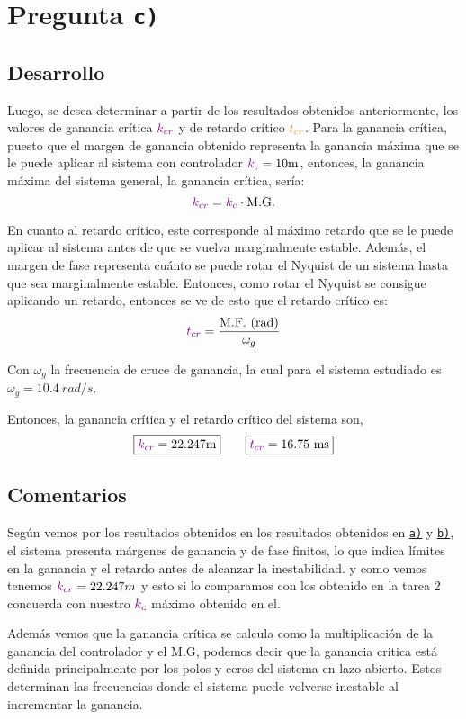 \section{Pregunta \texttt{c)}}\label{pregunta-c}

\subsection{Desarrollo}

Luego, se desea determinar a partir de los resultados obtenidos anteriormente,
los valores de ganancia crítica $\mathbin{\color{violet}k_{cr}}$ y de retardo crítico $\nara{t_{cr}}$.
Para la ganancia crítica, puesto que el margen de ganancia obtenido representa
la ganancia máxima que se le puede aplicar al sistema con controlador $\mora{k_{c}} = 10\unit{m}$,
entonces, la ganancia máxima del sistema general, la ganancia crítica, sería:
\begin{equation}
  \mathbin{\color{violet}k_{cr}} = \mathbin{\color{violet}k_{c}} \cdot \text{M.G.}
\end{equation}

En cuanto al retardo crítico, este corresponde al máximo retardo que se le
puede aplicar al sistema antes de que se vuelva marginalmente estable. Además,
el margen de fase representa cuánto se puede rotar el Nyquist de un sistema
hasta que sea marginalmente estable. Entonces, como rotar el Nyquist se consigue
aplicando un retardo, entonces se ve de esto que el retardo crítico es:
\begin{equation}
  \mora{t_{cr}} = \frac{\te{M.F.}\ \te{(rad)}}{\omega_{g}}
\end{equation}

Con $\omega_{g}$ la frecuencia de cruce de ganancia, la cual para el sistema
estudiado es $\omega_{g} = 10.4\ \unit{rad/s}$.

Entonces, la ganancia crítica y el retardo crítico del sistema son,
\begin{equation}
  \boxed{\mora{k_{cr}} = 22.247\unit{m}} \qquad \boxed{\mora{t_{cr}} = 16.75\ \unit{ms}}
\end{equation}


\FloatBarrier
\subsection{Comentarios}


Según vemos por los resultados obtenidos en los resultados obtenidos en \hyperref[pregunta-c]{\texttt{a)}} y \hyperref[pregunta-c]{\texttt{b)}}, el sistema presenta márgenes de ganancia y de fase finitos, lo que indica límites en la ganancia y el retardo antes de alcanzar la inestabilidad.
y como vemos tenemos \(\mathbin{\color{violet}k_{cr}} = 22.247 m\) y esto si lo comparamos con los obtenido en la tarea 2 \cite{tarea-2-sdc} concuerda con nuestro \(\mathbin{\color{violet}k_c}\) máximo obtenido en el. 

Además vemos que la ganancia crítica se calcula como la multiplicación de la ganancia del controlador y el M.G, podemos decir que la ganancia critica está definida principalmente por los polos y ceros del sistema en lazo abierto. Estos determinan las frecuencias donde el sistema puede volverse inestable al incrementar la ganancia.



